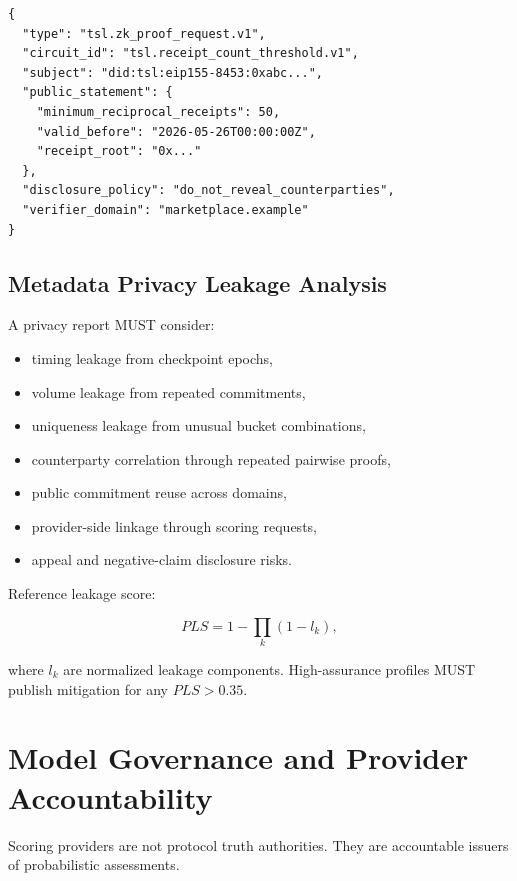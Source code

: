 \documentclass[11pt]{article}
\begin{document}
\begin{lstlisting}[style=tslcode]
{
  "type": "tsl.zk_proof_request.v1",
  "circuit_id": "tsl.receipt_count_threshold.v1",
  "subject": "did:tsl:eip155-8453:0xabc...",
  "public_statement": {
    "minimum_reciprocal_receipts": 50,
    "valid_before": "2026-05-26T00:00:00Z",
    "receipt_root": "0x..."
  },
  "disclosure_policy": "do_not_reveal_counterparties",
  "verifier_domain": "marketplace.example"
}
\end{lstlisting}

\subsection{Metadata Privacy Leakage Analysis}

A privacy report MUST consider:

\begin{itemize}
    \item timing leakage from checkpoint epochs,
    \item volume leakage from repeated commitments,
    \item uniqueness leakage from unusual bucket combinations,
    \item counterparty correlation through repeated pairwise proofs,
    \item public commitment reuse across domains,
    \item provider-side linkage through scoring requests,
    \item appeal and negative-claim disclosure risks.
\end{itemize}

Reference leakage score:

\begin{equation}
PLS=1-\prod_k(1-l_k),
\end{equation}

where \(l_k\) are normalized leakage components. High-assurance profiles MUST publish mitigation for any \(PLS>0.35\).

\section{Model Governance and Provider Accountability}

Scoring providers are not protocol truth authorities. They are accountable issuers of probabilistic assessments.
\end{document}
